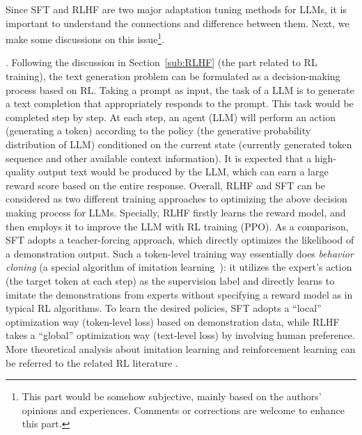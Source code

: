 {Since SFT and RLHF are two major adaptation tuning methods for LLMs, it is important to understand the connections and difference between them.  
Next, we make some discussions on this issue\footnote{This part would be somehow subjective, mainly based on the authors' opinions and experiences. Comments or corrections are welcome to enhance this part. }.

. Following the discussion in Section~\ref{sub:RLHF} (the part related to RL training),  the text generation problem can be formulated as a decision-making process based on RL. 
Taking a prompt as input, the task of a LLM is to generate a text completion that appropriately responds to the prompt. This task would be completed step by step. At each step, an  agent (\ie LLM) will perform an action (\ie generating a token) according to the policy (\ie the generative probability distribution of LLM) conditioned on the current state (currently generated token sequence and other available  context information). 
It is expected that a high-quality output text would be produced by the LLM, which can earn a large reward score based on the entire response.  
Overall, RLHF and SFT can be considered as two different training approaches to optimizing  the  above decision making process for LLMs.     
Specially, RLHF 
firstly learns the reward model, and then employs it to improve the LLM with RL training (\eg PPO). As a comparison, SFT adopts  a teacher-forcing approach, which directly optimizes the likelihood of  a demonstration output. 
Such a token-level training way essentially does  \emph{behavior cloning} (a special algorithm of imitation learning~\cite{Ahmed-ACM-2017-Imitation}): it utilizes the expert's action (\ie the target token at each step) as the supervision label and directly learns to imitate the demonstrations from experts without specifying a reward model as in typical RL algorithms. 
To learn the desired policies, 
SFT adopts a ``local'' optimization way (\ie token-level loss) based on demonstration data, while RLHF takes a  ``global'' optimization way (\ie text-level loss) by involving human preference. More theoretical analysis about  imitation learning and reinforcement learning can be referred to the related RL literature \cite{Ahmed-ACM-2017-Imitation,Levine-youtube-2022-Imitate}.  


%

}
